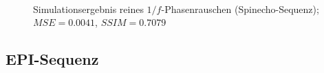 \begin{figure}[H]
	\centering
	\
	\caption[Simulationsergebnis reines $1/f$-Phasenrauschen (SE) (3)]{Simulationsergebnis reines $1/f$-Phasenrauschen (Spinecho-Sequenz); $MSE=0.0041$, $SSIM=0.7079$}
	\label{fig:res1overFse3}	
\end{figure}

\subsection{EPI-Sequenz}


